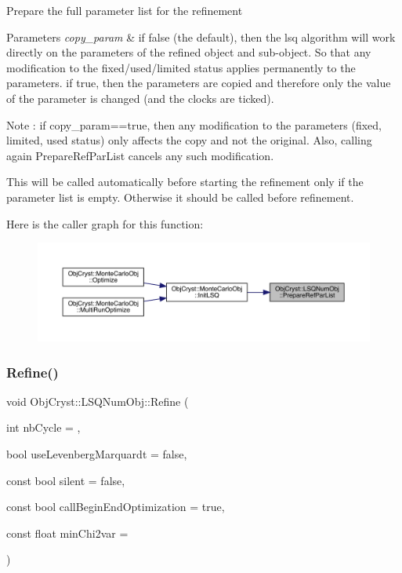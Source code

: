 Prepare the full parameter list for the refinement 
\begin{DoxyParams}{Parameters}
{\em copy\+\_\+param} & if false (the default), then the lsq algorithm will work directly on the parameters of the refined object and sub-\/object. So that any modification to the fixed/used/limited status applies permanently to the parameters. if true, then the parameters are copied and therefore only the value of the parameter is changed (and the clocks are ticked).\\
\hline
\end{DoxyParams}
\begin{DoxyNote}{Note}
\+: if copy\+\_\+param==true, then any modification to the parameters (fixed, limited, used status) only affects the copy and not the original. Also, calling again Prepare\+Ref\+Par\+List cancels any such modification.

This will be called automatically before starting the refinement only if the parameter list is empty. Otherwise it should be called before refinement. 
\end{DoxyNote}
Here is the caller graph for this function\+:
\nopagebreak
\begin{figure}[H]
\begin{center}
\leavevmode
\includegraphics[width=350pt]{class_obj_cryst_1_1_l_s_q_num_obj_afdeb58450a3e0506fc02a0b5df15a600_icgraph}
\end{center}
\end{figure}
\mbox{\label{class_obj_cryst_1_1_l_s_q_num_obj_aaf5ceefe54c4fdfd0e48c3f5cd4f66b9}} 
\subsubsection{\texorpdfstring{Refine()}{Refine()}}
{\footnotesize\ttfamily void Obj\+Cryst\+::\+L\+S\+Q\+Num\+Obj\+::\+Refine (\begin{DoxyParamCaption}\item[{int}]{nb\+Cycle = {},  }\item[{bool}]{use\+Levenberg\+Marquardt = {\ttfamily false},  }\item[{const bool}]{silent = {\ttfamily false},  }\item[{const bool}]{call\+Begin\+End\+Optimization = {\ttfamily true},  }\item[{const float}]{min\+Chi2var = {} }\end{DoxyParamCaption})}

